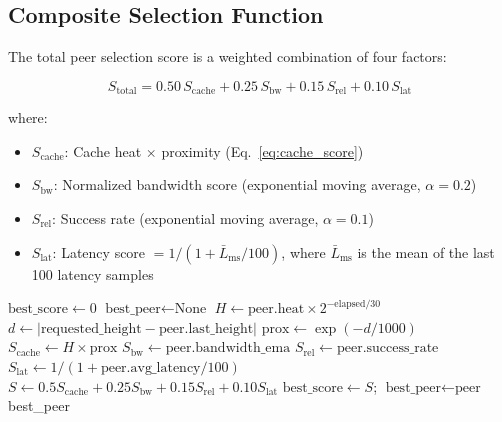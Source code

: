\documentclass[11pt,a4paper]{article}
\begin{document}
\subsection{Composite Selection Function}

The total peer selection score is a weighted combination of four factors:

\begin{equation}
\boxed{S_{\text{total}} = 0.50 \, S_{\text{cache}} + 0.25 \, S_{\text{bw}} + 0.15 \, S_{\text{rel}} + 0.10 \, S_{\text{lat}}}
\label{eq:selection}
\end{equation}

where:

\begin{itemize}
    \item $S_{\text{cache}}$: Cache heat $\times$ proximity (Eq.~\ref{eq:cache_score})
    \item $S_{\text{bw}}$: Normalized bandwidth score (exponential moving average, $\alpha = 0.2$)
    \item $S_{\text{rel}}$: Success rate (exponential moving average, $\alpha = 0.1$)
    \item $S_{\text{lat}}$: Latency score $= 1 / (1 + \bar{L}_{\text{ms}} / 100)$, where $\bar{L}_{\text{ms}}$ is the mean of the last 100 latency samples
\end{itemize}

\begin{algorithm}
\caption{Gravity-Assist Peer Selection}
\label{alg:gravity}
\begin{algorithmic}[1]
    \State $\text{best\_score} \gets 0$
    \State $\text{best\_peer} \gets \text{None}$
        \State $H \gets \text{peer.heat} \times 2^{-\text{elapsed}/30}$ 
        \State $d \gets |\text{requested\_height} - \text{peer.last\_height}|$
        \State $\text{prox} \gets \exp(-d / 1000)$
        \State $S_{\text{cache}} \gets H \times \text{prox}$
        \State $S_{\text{bw}} \gets \text{peer.bandwidth\_ema}$
        \State $S_{\text{rel}} \gets \text{peer.success\_rate}$
        \State $S_{\text{lat}} \gets 1 / (1 + \text{peer.avg\_latency} / 100)$
        \State $S \gets 0.5 S_{\text{cache}} + 0.25 S_{\text{bw}} + 0.15 S_{\text{rel}} + 0.10 S_{\text{lat}}$
            \State $\text{best\_score} \gets S$; $\text{best\_peer} \gets \text{peer}$
        \EndIf
    \EndFor
    \State \Return best\_peer
\EndProcedure
\end{algorithmic}
\end{algorithm}
\end{document}
